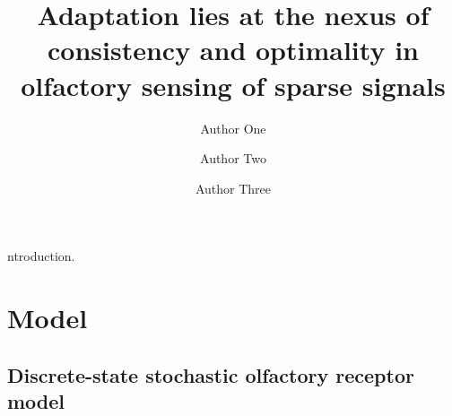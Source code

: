 \documentclass[9pt,twocolumn,twoside]{pnas-new}
\title{Adaptation lies at the nexus of consistency and optimality in olfactory sensing of sparse signals}
\author[a,c,1]{Author One}
\author[b,1,2]{Author Two}
\author[a]{Author Three}
\affil[a]{Affiliation One}
\affil[b]{Affiliation Two}
\affil[c]{Affiliation Three}
\begin{document}
\verticaladjustment{-2pt}

\maketitle
\thispagestyle{firststyle}


ntroduction. 



\section*{Model}

\subsection*{Discrete-state stochastic olfactory receptor model}
\end{document}
